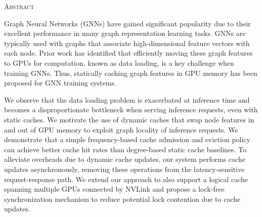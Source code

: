 \begin{center}
  \textsc{Abstract}
\end{center}
%
\noindent
%

Graph Neural Networks (GNNs) have gained significant popularity due to their excellent performance in many graph representation learning tasks. GNNs are typically used with graphs that associate high-dimensional feature vectors with each node. Prior work has identified that efficiently moving these graph features to GPUs for computation, known as data loading, is a key challenge when training GNNs. Thus, statically caching graph features in GPU memory has been proposed for GNN training systems. 

We observe that the data loading problem is exacerbated at inference time and becomes a disproportionate bottleneck when serving inference requests, even with static caches. We motivate the use of dynamic caches that swap node features in and out of GPU memory to exploit graph locality of inference requests. We demonstrate that a simple frequency-based cache admission and eviction policy can achieve better cache hit rates than degree-based static cache baselines. To alleviate overheads due to dynamic cache updates, our system performs cache updates asynchronously, removing these operations from the latency-sensitive request-response path. We extend our approach to also support a logical cache spanning multiple GPUs connected by NVLink and propose a lock-free synchronization mechanism to reduce potential lock contention due to cache updates.
